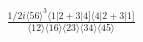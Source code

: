 \documentclass[varwidth, border=5pt]{standalone}
\begin{document}
\begin{my}
$\begin{gathered}
\scriptscriptstyle\frac{1/2i\langle56\rangle^3\langle1|2+3|4]\langle4|2+3|1]}{\langle12\rangle\langle16\rangle\langle23\rangle\langle34\rangle\langle45\rangle}
\end{gathered}$
\end{my}
\end{document}
